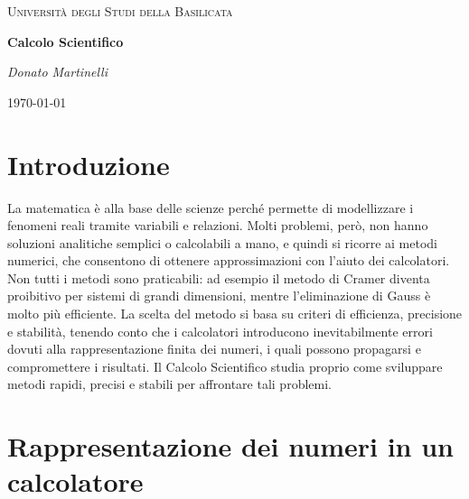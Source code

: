 \documentclass[a4paper,12pt]{article}
\theoremstyle{plain}
\theoremstyle{definition}
\theoremstyle{remark}
\begin{document}
\begin{titlepage}
    \centering
    {\textsc{Università degli Studi della Basilicata} \par}
    \vspace{2cm}
    {\huge\bfseries Calcolo Scientifico\par}
    
    \vfill
    {\Large\itshape Donato Martinelli\par}
    {\large \today\par}
\end{titlepage}

\tableofcontents

\section{Introduzione}

La matematica è alla base delle scienze perché permette di modellizzare i fenomeni reali tramite 
variabili e relazioni. Molti problemi, però, non hanno soluzioni analitiche semplici o calcolabili 
a mano, e quindi si ricorre ai metodi numerici, che consentono di ottenere approssimazioni con 
l'aiuto dei calcolatori. Non tutti i metodi sono praticabili: ad esempio il metodo di Cramer diventa 
proibitivo per sistemi di grandi dimensioni, mentre l'eliminazione di Gauss è molto più efficiente. 
La scelta del metodo si basa su criteri di efficienza, precisione e stabilità, tenendo conto che i 
calcolatori introducono inevitabilmente errori dovuti alla rappresentazione finita dei numeri, i 
quali possono propagarsi e compromettere i risultati.
Il Calcolo Scientifico studia proprio come sviluppare metodi 
rapidi, precisi e stabili per affrontare tali problemi.

\section{Rappresentazione dei numeri in un calcolatore}
\end{document}
